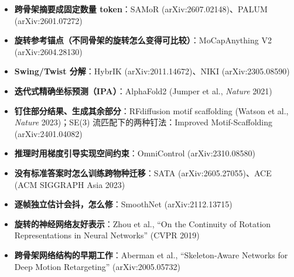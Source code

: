 \documentclass[11pt,a4paper]{ctexart}
\begin{document}
\begin{itemize}[leftmargin=1.6em]
    \item \textbf{跨骨架摘要成固定数量 token}：SAMoR (arXiv:2607.02148)、PALUM (arXiv:2601.07272)
    \item \textbf{旋转参考锚点（不同骨架的旋转怎么变得可比较）}：MoCapAnything V2 (arXiv:2604.28130)
    \item \textbf{Swing/Twist 分解}：HybrIK (arXiv:2011.14672)、NIKI (arXiv:2305.08590)
    \item \textbf{迭代式精确坐标预测（IPA）}：AlphaFold2 (Jumper et al., \textit{Nature} 2021)
    \item \textbf{钉住部分结果、生成其余部分}：RFdiffusion motif scaffolding (Watson et al., \textit{Nature} 2023)；SE(3) 流匹配下的两种钉法：Improved Motif-Scaffolding (arXiv:2401.04082)
    \item \textbf{推理时用梯度引导实现空间约束}：OmniControl (arXiv:2310.08580)
    \item \textbf{没有标准答案时怎么训练跨物种迁移}：SATA (arXiv:2605.27055)、ACE (ACM SIGGRAPH Asia 2023)
    \item \textbf{逐帧独立估计会抖，怎么修}：SmoothNet (arXiv:2112.13715)
    \item \textbf{旋转的神经网络友好表示}：Zhou et al., ``On the Continuity of Rotation Representations in Neural Networks'' (CVPR 2019)
    \item \textbf{跨骨架网络结构的早期工作}：Aberman et al., ``Skeleton-Aware Networks for Deep Motion Retargeting'' (arXiv:2005.05732)
\end{itemize}
\end{document}
